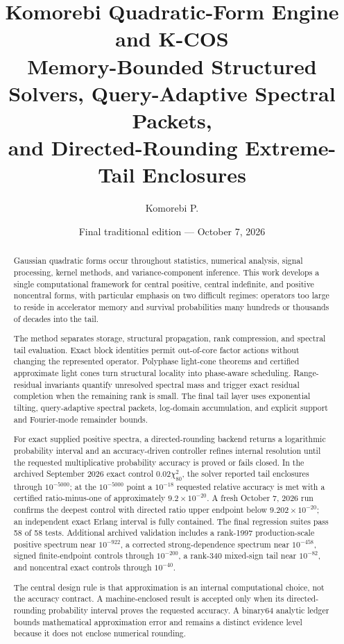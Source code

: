 \documentclass[11pt]{article}
\title{\textbf{Komorebi Quadratic-Form Engine and K-COS}\\
\large Memory-Bounded Structured Solvers, Query-Adaptive Spectral Packets,\\
and Directed-Rounding Extreme-Tail Enclosures}
\author{Komorebi P.}
\date{Final traditional edition --- October 7, 2026}
\theoremstyle{definition}
\theoremstyle{remark}
\begin{document}
\KomorebiCover

\relax

\begin{abstract}
Gaussian quadratic forms occur throughout statistics, numerical analysis,
signal processing, kernel methods, and variance-component inference.  This
work develops a single computational framework for central positive,
central indefinite, and positive noncentral forms, with particular emphasis
on two difficult regimes: operators too large to reside in accelerator memory
and survival probabilities many hundreds or thousands of decades into the
tail.

The method separates storage, structural propagation, rank compression, and
spectral tail evaluation.  Exact block identities permit out-of-core factor
actions without changing the represented operator.  Polyphase light-cone
theorems and certified approximate light cones turn structural locality into
phase-aware scheduling.  Range-residual invariants quantify unresolved
spectral mass and trigger exact residual completion when the remaining rank is
small.  The final tail layer uses exponential tilting, query-adaptive spectral
packets, log-domain accumulation, and explicit support and Fourier-mode
remainder bounds.

For exact supplied positive spectra, a directed-rounding backend returns a
logarithmic probability interval and an accuracy-driven controller refines
internal resolution until the requested multiplicative probability accuracy is
proved or fails closed.  In the archived September 2026 exact control
\(0.02\chi^2_{80}\), the solver reported tail enclosures through \(10^{-5000}\);
at the \(10^{-5000}\) point a \(10^{-18}\) requested relative accuracy is
met with a certified ratio-minus-one of approximately
\(9.2\times10^{-20}\).  A fresh October 7, 2026 run confirms the deepest control with directed
ratio upper endpoint below \(9.202\times10^{-20}\); an independent exact
Erlang interval is fully contained.  The final regression suites pass 58 of
58 tests.  Additional archived validation includes a rank-1997
production-scale positive spectrum near \(10^{-922}\), a corrected
strong-dependence spectrum near \(10^{-458}\), signed finite-endpoint controls
through \(10^{-200}\), a rank-340 mixed-sign tail near \(10^{-82}\), and
noncentral exact controls through \(10^{-40}\).

The central design rule is that approximation is an internal computational
choice, not the accuracy contract.  A machine-enclosed result is accepted only when its directed-rounding
probability interval proves the requested accuracy.  A binary64 analytic
ledger bounds mathematical approximation error and remains a distinct
evidence level because it does not enclose numerical rounding.
\end{abstract}
\end{document}
